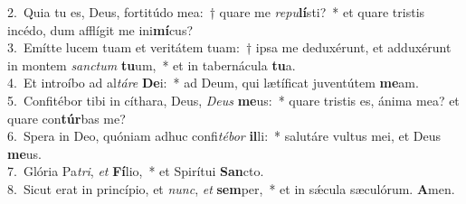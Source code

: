 {2.~}Quia tu es, Deus, fortitúdo mea:~† quare me \textit{re}\textit{pu}\textbf{lí}sti?~* et quare tristis incédo, dum afflígit me ini\textbf{mí}cus?\\
{3.~}Emítte lucem tuam et veritátem tuam:~† ipsa me deduxérunt, et adduxérunt in montem \textit{san}\textit{ctum} \textbf{tu}um,~* et in tabernácula \textbf{tu}a.\\
{4.~}Et introíbo ad al\textit{tá}\textit{re} \textbf{De}i:~* ad Deum, qui lætíficat juventútem \textbf{me}am.\\
{5.~}Confitébor tibi in cíthara, Deus, \textit{De}\textit{us} \textbf{me}us:~* quare tristis es, ánima mea? et quare con\textbf{túr}bas me?\\
{6.~}Spera in Deo, quóniam adhuc confi\textit{té}\textit{bor} \textbf{il}li:~* salutáre vultus mei, et Deus \textbf{me}us.\\
{7.~}Glória Pa\textit{tri}, \textit{et} \textbf{Fí}lio,~* et Spirítui \textbf{San}cto.\\
{8.~}Sicut erat in princípio, et \textit{nunc}, \textit{et} \textbf{sem}per,~* et in sǽcula sæculórum. \textbf{A}men.\\
